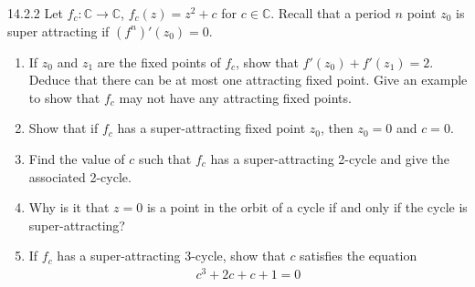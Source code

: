 \begin{problem}{14.2.2}
  Let $f_c: \mathbb{C} \to \mathbb{C}$, $f_c(z) = z^2 + c$ for $c\in\mathbb{C}$. Recall that
  a period $n$ point $z_0$ is super attracting if $(f^n)'(z_0) = 0$.
  \begin{enumerate}
    \item If $z_0$ and $z_1$ are the fixed points of $f_c$, show that $f'(z_0) + f'(z_1) = 2$.
      Deduce that there can be at most one attracting fixed point. Give an example
      to show that $f_c$ may not have any attracting fixed points.
    \item Show that if $f_c$ has a super-attracting fixed point $z_0$, then $z_0 = 0$ and $c=0$.
    \item Find the value of $c$ such that $f_c$ has a super-attracting 2-cycle and give
      the associated 2-cycle.
    \item Why is it that $z=0$ is a point in the orbit of a cycle if and only
      if the cycle is super-attracting?
    \item If $f_c$ has a super-attracting 3-cycle, show that $c$ satisfies the equation
      \begin{align*}
        c^3 + 2c + c + 1 = 0
      \end{align*}
  \end{enumerate}
\end{problem}

